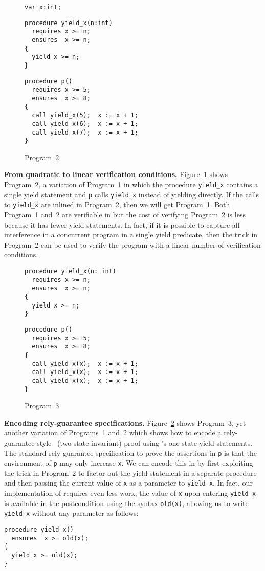 \begin{figure}
\begin{verbatim}
var x:int;
\end{verbatim}
\begin{verbatim}
procedure yield_x(n:int)
  requires x >= n;
  ensures  x >= n;
{
  yield x >= n;
}
\end{verbatim}
\begin{verbatim}
procedure p()
  requires x >= 5;
  ensures  x >= 8;
{
  call yield_x(5);  x := x + 1;
  call yield_x(6);  x := x + 1;
  call yield_x(7);  x := x + 1;
}
\end{verbatim}
\caption{Program~2}
\label{fig:ex2}
\end{figure}

{\bf From quadratic to linear verification conditions.}
Figure~\ref{fig:ex2} shows Program~2, a variation of Program~1 in which the procedure {\tt yield\_x} 
contains a single yield statement and {\tt p} calls {\tt yield\_x} instead of yielding directly.
If the calls to {\tt yield\_x} are inlined in Program~2, then we will get Program~1.
Both Program~1 and~2 are verifiable in \civl but the cost of verifying Program~2 is less because it has fewer yield statements.
In fact, if it is possible to capture all interference in a concurrent program in a single yield predicate, 
then the trick in Program~2 can be used to verify the program with a linear number of verification conditions.

\begin{figure}
\begin{verbatim}
procedure yield_x(n: int)
  requires x >= n;
  ensures  x >= n;
{
  yield x >= n;
}
\end{verbatim}
\begin{verbatim}
procedure p()
  requires x >= 5;
  ensures  x >= 8;
{
  call yield_x(x);  x := x + 1;
  call yield_x(x);  x := x + 1;
  call yield_x(x);  x := x + 1;
}
\end{verbatim}
\caption{Program~3}
\label{fig:ex3}
\end{figure}

{\bf Encoding rely-guarantee specifications.}
Figure~\ref{fig:ex3} shows Program~3, yet another variation of Programs~1 and~2 which shows how to encode a rely-guarantee-style~\cite{Jones83} (two-state invariant)
proof using \civl's one-state yield statements. 
The standard rely-guarantee specification to prove the assertions in {\tt p} is that the environment of {\tt p} 
may only increase {\tt x}.
We can encode this in \civl by first exploiting the trick in Program~2 to factor out the yield statement in a separate procedure
and then passing the current value of {\tt x} as a parameter to {\tt yield\_x}.
In fact, our implementation of \civl requires even less work; the value of {\tt x} upon entering {\tt yield\_x} is available 
in the postcondition using the syntax {\tt old(x)}, allowing us to write {\tt yield\_x} without any parameter as follows:
\begin{verbatim}
procedure yield_x()
  ensures  x >= old(x);
{
  yield x >= old(x);
}
\end{verbatim}


